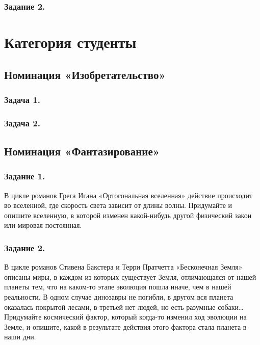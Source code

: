 \documentclass[11pt,a4paper]{article}
\begin{document}
\subsubsection*{Задание 2.}\VideoThree

\GeneralText
\clearpage

\section{Категория студенты}

\subsection{Номинация «Изобретательство»}

\subsubsection*{Задача 1.}\Aberration
\subsubsection*{Задача 2.}\CosmicOperation

\subsection{Номинация «Фантазирование»}

\subsubsection*{Задание 1.}
В цикле романов Грега Игана «Ортогональная вселенная» действие происходит во
вселенной, где скорость света зависит от длины волны. Придумайте и опишите
вселенную, в которой изменен какой-нибудь другой физический закон или мировая
постоянная.

\subsubsection*{Задание 2.} 
В цикле романов Стивена Бакстера и Терри Пратчетта «Бесконечная Земля» описаны
миры, в каждом из которых существует Земля, отличающаяся от нашей планеты тем,
что на каком-то этапе эволюция пошла иначе, чем в нашей реальности. В одном
случае динозавры не погибли, в другом вся планета оказалась покрытой лесами, в
третьей нет людей, но есть разумные собаки…  Придумайте космический фактор,
который когда-то изменил ход эволюции на Земле, и опишите, какой в результате
действия этого фактора стала планета в наши дни.
\end{document}
